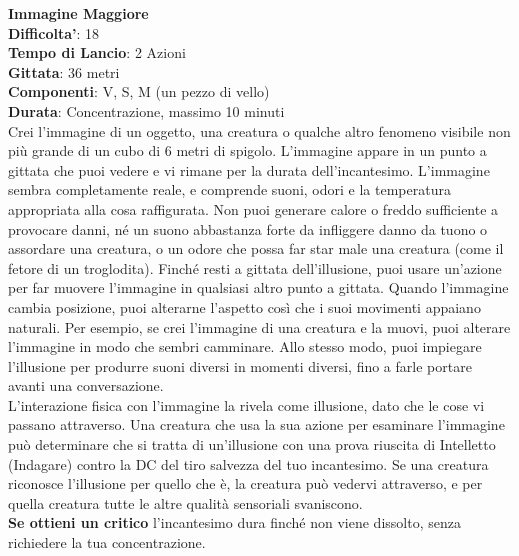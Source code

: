 \begin{multicols}{2}
\medskip\textbf{Immagine Maggiore}\\
\textbf{Difficolta'}: 18\\
\textbf{Tempo di Lancio}: 2 Azioni\\
\textbf{Gittata}: 36 metri\\
\textbf{Componenti}: V, S, M (un pezzo di vello)\\
\textbf{Durata}: Concentrazione, massimo 10 minuti\\
Crei l’immagine di un oggetto, una creatura o qualche altro fenomeno visibile non più grande di un cubo di 6 metri di spigolo. L’immagine appare in un punto a gittata che puoi vedere e vi rimane per la durata dell’incantesimo. L’immagine sembra completamente reale, e comprende suoni, odori e la temperatura appropriata alla cosa raffigurata. Non puoi generare calore o freddo sufficiente a provocare danni, né un suono abbastanza forte da infliggere danno da tuono o assordare una creatura, o un odore che possa far star male una creatura (come il fetore di un troglodita). Finché resti a gittata dell’illusione, puoi usare un’azione per far muovere l’immagine in qualsiasi altro punto a 
gittata. Quando l’immagine cambia posizione, puoi alterarne l’aspetto così che i suoi movimenti appaiano naturali. Per esempio, se crei l’immagine di una creatura e la muovi, puoi alterare l’immagine in modo che sembri camminare. Allo stesso modo, puoi impiegare l’illusione per produrre suoni diversi in momenti diversi, fino a farle portare avanti una conversazione.\\
L’interazione fisica con l’immagine la rivela come illusione, dato che le cose vi passano attraverso. Una creatura che usa la sua azione per esaminare l’immagine può determinare che si tratta di un’illusione con una prova riuscita di Intelletto (Indagare) contro la DC del tiro salvezza del tuo incantesimo. Se una creatura riconosce l’illusione per quello che è, la creatura può vedervi attraverso, e per quella creatura tutte le altre qualità sensoriali svaniscono.\\
\textbf{Se ottieni un critico} l’incantesimo dura finché non viene dissolto, senza richiedere la tua concentrazione.
	

\end{multicols}
